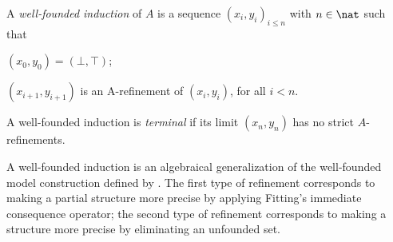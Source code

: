 { \begin{definition}
 A \emph{well-founded induction} of $A$  is a sequence 
$(x_i,y_i)_{i\leq n}$
with $n\in\nat$ such that 
\begin{compactitem}
	\item $(x_0,y_0) = (\bot,\top)$;
	\item $(x_{i+1},y_{i+1})$ is an A-refinement of $(x_{i},y_{i})$, for  all $i<n$.
\end{compactitem}
A well-founded induction is \emph{terminal} if its limit $(x_n,y_n)$ has no strict $A$-refinements.
\end{definition}
A well-founded induction is an algebraical generalization of the well-founded model construction defined by \citet{GelderRS91}. 
The first type of refinement corresponds to making a partial structure more precise by applying Fitting's immediate consequence operator; the second type of refinement corresponds to making a structure more precise by eliminating an unfounded set. 

}
